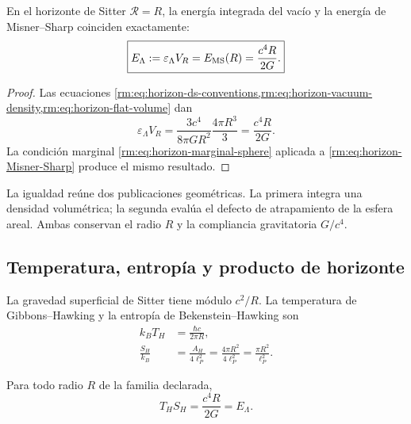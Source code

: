 \begin{theorem}
\label{rm:thm:horizon-vacuum-MS}
En el horizonte de Sitter \(\mathcal R=R\), la energ\'ia integrada del
vac\'io y la energ\'ia de Misner--Sharp coinciden exactamente:
\begin{equation}
 \boxed{
 E_\Lambda
 :=\varepsilon_\Lambda V_R
 =E_{\rm MS}(R)
 =\frac{c^4R}{2G}.}
 \label{rm:eq:horizon-E-Lambda}
\end{equation}
\end{theorem}

\begin{proof}
Las ecuaciones
\cref{rm:eq:horizon-ds-conventions,rm:eq:horizon-vacuum-density,rm:eq:horizon-flat-volume}
dan
\[
 \varepsilon_\Lambda V_R
 =\frac{3c^4}{8\pi GR^2}\frac{4\pi R^3}{3}
 =\frac{c^4R}{2G}.
\]
La condici\'on marginal \cref{rm:eq:horizon-marginal-sphere} aplicada a
\cref{rm:eq:horizon-Misner-Sharp} produce el mismo resultado.
\end{proof}

La igualdad re\'une dos publicaciones geom\'etricas. La primera integra una
densidad volum\'etrica; la segunda eval\'ua el defecto de atrapamiento de la
esfera areal. Ambas conservan el radio \(R\) y la compliancia gravitatoria
\(G/c^4\).

\subsection{Temperatura, entrop\'ia y producto de horizonte}

La gravedad superficial de Sitter tiene m\'odulo \(c^2/R\). La temperatura
de Gibbons--Hawking \cite{rm:GibbonsHawking1977} y la entrop\'ia de
Bekenstein--Hawking \cite{rm:Bekenstein1973,rm:Hawking1975} son
\begin{align}
 k_BT_H&=\frac{\hbar c}{2\pi R},
 \label{rm:eq:horizon-temperature}\\
 \frac{S_H}{k_B}
 &=\frac{A_H}{4\ell_P^2}
 =\frac{4\pi R^2}{4\ell_P^2}
 =\frac{\pi R^2}{\ell_P^2}.
 \label{rm:eq:horizon-entropy}
\end{align}

\begin{theorem}
\label{rm:thm:horizon-TS}
Para todo radio \(R\) de la familia declarada,
\begin{equation}
 \boxed{
 T_HS_H=\frac{c^4R}{2G}=E_\Lambda.}
 \label{rm:eq:horizon-TS-E}
\end{equation}
\end{theorem}

